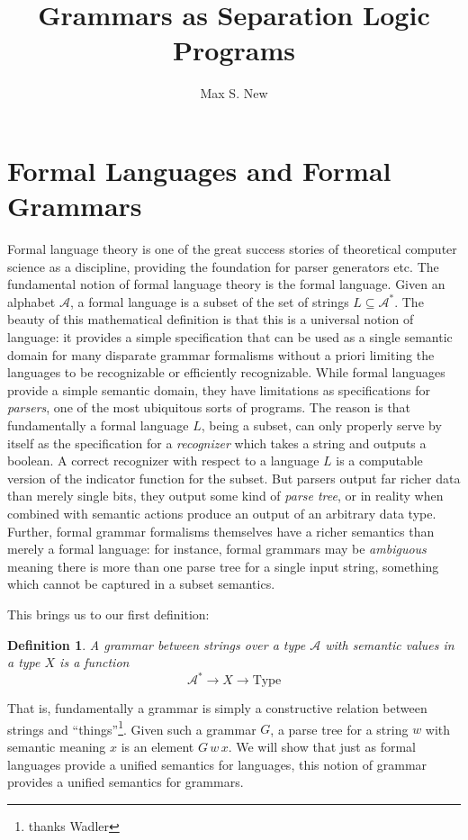 \documentclass[12pt]{article}
\newtheorem{definition}{Definition}
\begin{document}
\title{Grammars as Separation Logic Programs}
\author{Max S. New}
\maketitle

\section{Formal Languages and Formal Grammars}

Formal language theory is one of the great success stories of
theoretical computer science as a discipline, providing the foundation
for parser generators etc. The fundamental notion of formal language
theory is the formal language. Given an alphabet $\mathcal A$, a
formal language is a subset of the set of strings $L \subseteq
\mathcal A^*$. The beauty of this mathematical definition is that this
is a universal notion of language: it provides a simple specification
that can be used as a single semantic domain for many disparate
grammar formalisms without a priori limiting the languages to be
recognizable or efficiently recognizable. While formal languages
provide a simple semantic domain, they have limitations as
specifications for \emph{parsers}, one of the most ubiquitous sorts of
programs. The reason is that fundamentally a formal language $L$,
being a subset, can only properly serve by itself as the specification
for a \emph{recognizer} which takes a string and outputs a boolean. A
correct recognizer with respect to a language $L$ is a computable
version of the indicator function for the subset. But parsers output
far richer data than merely single bits, they output some kind of
\emph{parse tree}, or in reality when combined with semantic actions
produce an output of an arbitrary data type. Further, formal grammar
formalisms themselves have a richer semantics than merely a formal
language: for instance, formal grammars may be \emph{ambiguous}
meaning there is more than one parse tree for a single input string,
something which cannot be captured in a subset semantics.

This brings us to our first definition:
\begin{definition}
  A grammar between strings over a type $\mathcal A$ with semantic
  values in a type $X$ is a function
  \[ \mathcal A^* \to X \to \textrm{Type} \]
\end{definition}
That is, fundamentally a grammar is simply a constructive relation
between strings and ``things''\footnote{thanks Wadler}. Given such a
grammar $G$, a parse tree for a string $w$ with semantic meaning $x$
is an element $G\,w\,x$. We will show that just as formal languages
provide a unified semantics for languages, this notion of grammar
provides a unified semantics for grammars.
\end{document}
